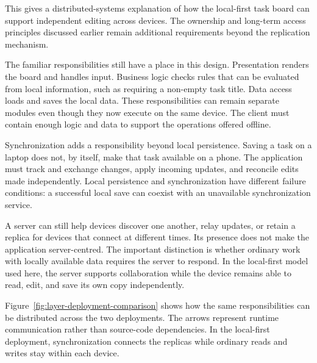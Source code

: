 This gives a distributed-systems explanation of how the local-first task board can support independent editing across devices.
The ownership and long-term access principles discussed earlier remain additional requirements beyond the replication mechanism.

The familiar responsibilities still have a place in this design.
Presentation renders the board and handles input.
Business logic checks rules that can be evaluated from local information, such as requiring a non-empty task title.
Data access loads and saves the local data.
These responsibilities can remain separate modules even though they now execute on the same device.
The client must contain enough logic and data to support the operations offered offline.

Synchronization adds a responsibility beyond local persistence.
Saving a task on a laptop does not, by itself, make that task available on a phone.
The application must track and exchange changes, apply incoming updates, and reconcile edits made independently.
Local persistence and synchronization have different failure conditions: a successful local save can coexist with an unavailable synchronization service.
\parencite[Chapter~5]{designing-data-intensive-applications}

A server can still help devices discover one another, relay updates, or retain a replica for devices that connect at different times.
Its presence does not make the application server-centred.
The important distinction is whether ordinary work with locally available data requires the server to respond.
In the local-first model used here, the server supports collaboration while the device remains able to read, edit, and save its own copy independently.
\parencite{local-first-software}

Figure~\ref{fig:layer-deployment-comparison} shows how the same responsibilities can be distributed across the two deployments.
The arrows represent runtime communication rather than source-code dependencies.
In the local-first deployment, synchronization connects the replicas while ordinary reads and writes stay within each device.

\begin{illustration}[htbp]
	\centering
	\caption{Placement of layers and persistent data in the two task-board deployments}
	\label{fig:layer-deployment-comparison}
	\begingroup
	
	\endgroup
\end{illustration}
\FloatBarrier

